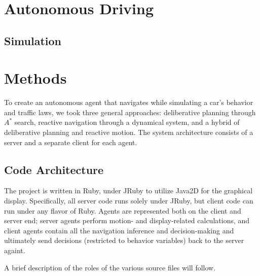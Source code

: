 \documentclass{article}
\begin{document}
\section{Autonomous Driving}

\subsection{Simulation}

\section{Methods}

To create an autonomous agent that navigates while simulating a car's behavior
and traffic laws, we took three general approaches: deliberative planning
through $A^*$ search, reactive navigation through a dynamical system, and a
hybrid of deliberative planning and reactive motion. The system architecture
consists of a server and a separate client for each agent.

\subsection{Code Architecture}

The project is written in Ruby, under JRuby to utilize Java2D for the graphical
display. Specifically, all server code runs solely under JRuby, but client
code can run under any flavor of Ruby. Agents are represented both on the client
and server end; server agents perform motion- and display-related
calculations, and client agents contain all the navigation inference and
decision-making and ultimately send decisions (restricted to behavior variables)
back to the server againt.

A brief description of the roles of the various source files will follow.
\end{document}
